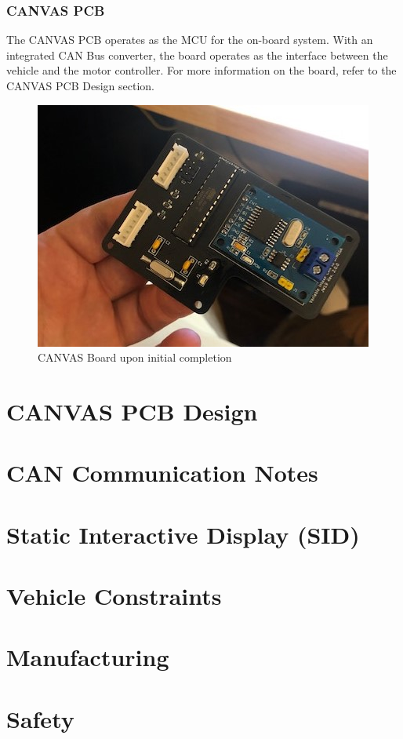 \documentclass{article}
\begin{document}
\subsubsection{CANVAS PCB}
The CANVAS PCB operates as the MCU for the on-board system. With an integrated CAN Bus converter, the board operates as the interface between the vehicle and the motor controller. For more information on the board, refer to the CANVAS PCB Design section. 

\begin{figure}[h!]
\centering
\includegraphics[scale=0.6]{pcb_2.jpg}
\caption{CANVAS Board upon initial completion}
\label{fig:CANVAS_WorkBench}
\end{figure}

\section{CANVAS PCB Design}
\section{CAN Communication Notes}
\section{Static Interactive Display (SID)}
\section{Vehicle Constraints}
\section{Manufacturing}
\section{Safety}
\end{document}
